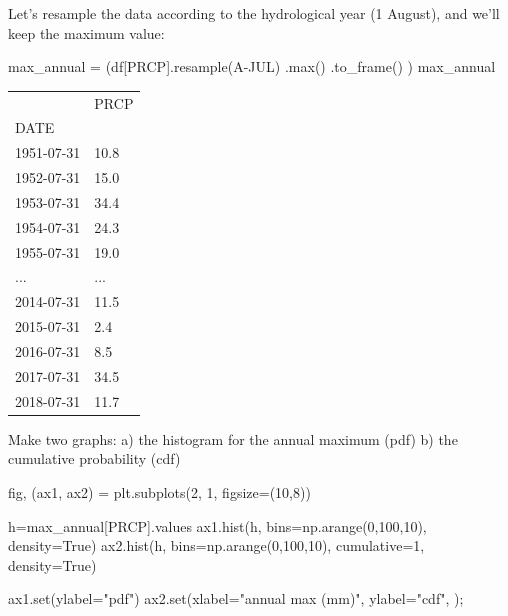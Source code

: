 \documentclass[
  letterpaper,
  DIV=11,
  numbers=noendperiod]{scrreprt}
\newenvironment{Shaded}{\begin{snugshade}}{\end{snugshade}}
\newcommand{\BuiltInTok}[1]{\textcolor[rgb]{0.00,0.23,0.31}{#1}}
\newcommand{\DecValTok}[1]{\textcolor[rgb]{0.68,0.00,0.00}{#1}}
\newcommand{\NormalTok}[1]{\textcolor[rgb]{0.00,0.23,0.31}{#1}}
\newcommand{\OperatorTok}[1]{\textcolor[rgb]{0.37,0.37,0.37}{#1}}
\newcommand{\StringTok}[1]{\textcolor[rgb]{0.13,0.47,0.30}{#1}}
\newcommand{\VariableTok}[1]{\textcolor[rgb]{0.07,0.07,0.07}{#1}}
\begin{document}
Let's resample the data according to the hydrological year (1 August),
and we'll keep the maximum value:

\begin{Shaded}
\begin{Highlighting}[]
\NormalTok{max\_annual }\OperatorTok{=}\NormalTok{ (df[}\StringTok{\textquotesingle{}PRCP\textquotesingle{}}\NormalTok{].resample(}\StringTok{\textquotesingle{}A{-}JUL\textquotesingle{}}\NormalTok{)}
\NormalTok{                        .}\BuiltInTok{max}\NormalTok{()}
\NormalTok{                        .to\_frame()}
\NormalTok{             )}
\NormalTok{max\_annual}
\end{Highlighting}
\end{Shaded}

\begin{longtable}[]{@{}ll@{}}
\toprule()
& PRCP \\
DATE & \\
\midrule()
\endhead
1951-07-31 & 10.8 \\
1952-07-31 & 15.0 \\
1953-07-31 & 34.4 \\
1954-07-31 & 24.3 \\
1955-07-31 & 19.0 \\
... & ... \\
2014-07-31 & 11.5 \\
2015-07-31 & 2.4 \\
2016-07-31 & 8.5 \\
2017-07-31 & 34.5 \\
2018-07-31 & 11.7 \\
\bottomrule()
\end{longtable}

Make two graphs: a) the histogram for the annual maximum (pdf) b) the
cumulative probability (cdf)

\begin{Shaded}
\begin{Highlighting}[]
\NormalTok{fig, (ax1, ax2) }\OperatorTok{=}\NormalTok{ plt.subplots(}\DecValTok{2}\NormalTok{, }\DecValTok{1}\NormalTok{, figsize}\OperatorTok{=}\NormalTok{(}\DecValTok{10}\NormalTok{,}\DecValTok{8}\NormalTok{))}

\NormalTok{h}\OperatorTok{=}\NormalTok{max\_annual[}\StringTok{\textquotesingle{}PRCP\textquotesingle{}}\NormalTok{].values}
\NormalTok{ax1.hist(h, bins}\OperatorTok{=}\NormalTok{np.arange(}\DecValTok{0}\NormalTok{,}\DecValTok{100}\NormalTok{,}\DecValTok{10}\NormalTok{), density}\OperatorTok{=}\VariableTok{True}\NormalTok{)}
\NormalTok{ax2.hist(h, bins}\OperatorTok{=}\NormalTok{np.arange(}\DecValTok{0}\NormalTok{,}\DecValTok{100}\NormalTok{,}\DecValTok{10}\NormalTok{), cumulative}\OperatorTok{=}\DecValTok{1}\NormalTok{, density}\OperatorTok{=}\VariableTok{True}\NormalTok{)}

\NormalTok{ax1.}\BuiltInTok{set}\NormalTok{(ylabel}\OperatorTok{=}\StringTok{"pdf"}\NormalTok{)}
\NormalTok{ax2.}\BuiltInTok{set}\NormalTok{(xlabel}\OperatorTok{=}\StringTok{"annual max (mm)"}\NormalTok{,}
\NormalTok{        ylabel}\OperatorTok{=}\StringTok{"cdf"}\NormalTok{,}
\NormalTok{        )}\OperatorTok{;}
\end{Highlighting}
\end{Shaded}
\end{document}
